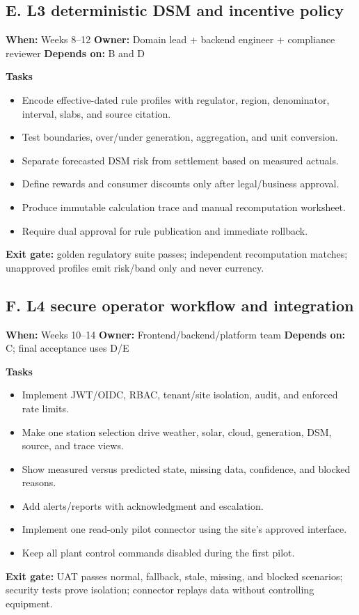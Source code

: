 \documentclass[11pt,a4paper]{article}
\begin{document}
\subsection{E. L3 deterministic DSM and incentive policy}
\textbf{When:} Weeks 8--12 \quad
\textbf{Owner:} Domain lead + backend engineer + compliance reviewer \quad
\textbf{Depends on:} B and D

\textbf{Tasks}
\begin{itemize}
  \item Encode effective-dated rule profiles with regulator, region, denominator, interval,
        slabs, and source citation.
  \item Test boundaries, over/under generation, aggregation, and unit conversion.
  \item Separate forecasted DSM risk from settlement based on measured actuals.
  \item Define rewards and consumer discounts only after legal/business approval.
  \item Produce immutable calculation trace and manual recomputation worksheet.
  \item Require dual approval for rule publication and immediate rollback.
\end{itemize}
\textbf{Exit gate:} golden regulatory suite passes; independent recomputation matches;
unapproved profiles emit risk/band only and never currency.

\subsection{F. L4 secure operator workflow and integration}
\textbf{When:} Weeks 10--14 \quad
\textbf{Owner:} Frontend/backend/platform team \quad
\textbf{Depends on:} C; final acceptance uses D/E

\textbf{Tasks}
\begin{itemize}
  \item Implement JWT/OIDC, RBAC, tenant/site isolation, audit, and enforced rate limits.
  \item Make one station selection drive weather, solar, cloud, generation, DSM, source,
        and trace views.
  \item Show measured versus predicted state, missing data, confidence, and blocked reasons.
  \item Add alerts/reports with acknowledgment and escalation.
  \item Implement one read-only pilot connector using the site's approved interface.
  \item Keep all plant control commands disabled during the first pilot.
\end{itemize}
\textbf{Exit gate:} UAT passes normal, fallback, stale, missing, and blocked scenarios;
security tests prove isolation; connector replays data without controlling equipment.
\end{document}
